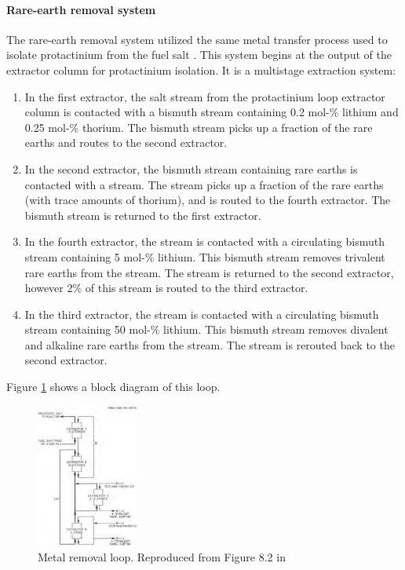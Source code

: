\paragraph{Rare-earth removal system}
The rare-earth removal system utilized the same metal transfer process used to
isolate protactinium from the fuel salt \cite{robertson_conceptual_1971}. This
system begins at the output of the extractor column for protactinium isolation.
It is a multistage extraction system:
\begin{enumerate}
    \item In the first extractor, the salt stream from the protactinium loop
    extractor column is contacted with a bismuth stream containing 0.2 mol-\%
    lithium and 0.25 mol-\% thorium. The bismuth stream picks up a fraction of
    the rare earths and routes to the second extractor.
    \item In the second extractor, the bismuth stream containing rare earths is
    contacted with a  stream.  The  stream picks up a fraction
    of the rare earths (with trace amounts of thorium), and is routed to the
    fourth extractor. The bismuth stream is returned to the first extractor.
    \item In the fourth extractor, the  stream is contacted with a
    circulating bismuth stream containing 5 mol-\% lithium. This bismuth stream
    removes trivalent rare earths from the  stream. The 
    stream is returned to the second extractor, however 2\% of this 
    stream is routed to the third extractor.
    \item In the third extractor, the  stream is contacted with a
    circulating bismuth stream containing 50 mol-\% lithium. This bismuth stream
    removes divalent and alkaline rare earths from the  stream. The
     stream is rerouted back to the second extractor.
\end{enumerate}

Figure \ref{fig:metal-removal} shows a block diagram of this loop. 

\begin{figure}[htpb]
    \centering
    \includegraphics[width=0.3\textwidth]{figs/ch4/metal_removal_loop.png}
    \caption{Metal removal loop. Reproduced from Figure 8.2 in \cite{robertson_conceptual_1971}}
    \label{fig:metal-removal}
\end{figure}


